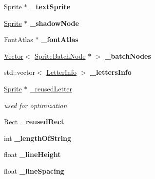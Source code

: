 \begin{DoxyCompactItemize}
\mbox{\label{classLabel_a6715bd9c3cac7e5ca418534b9029056e}} 
\hyperlink{classSprite}{Sprite} $\ast$ {\bfseries \+\_\+text\+Sprite}
\item 
\mbox{\label{classLabel_acd459f1643def3eae29b4838f9bdc1d3}} 
\hyperlink{classSprite}{Sprite} $\ast$ {\bfseries \+\_\+shadow\+Node}
\item 
\mbox{\label{classLabel_ad01212222e70bbb8566f6f8691d4c95e}} 
Font\+Atlas $\ast$ {\bfseries \+\_\+font\+Atlas}
\item 
\mbox{\label{classLabel_a86151a330d6714cc939d6b8fc16f3f85}} 
\hyperlink{classVector}{Vector}$<$ \hyperlink{classSpriteBatchNode}{Sprite\+Batch\+Node} $\ast$ $>$ {\bfseries \+\_\+batch\+Nodes}
\item 
\mbox{\label{classLabel_a4050f38882b85db87a44968c7234a4a8}} 
std\+::vector$<$ \hyperlink{structLabel_1_1LetterInfo}{Letter\+Info} $>$ {\bfseries \+\_\+letters\+Info}
\item 
\mbox{\label{classLabel_afe535db3ec9d3884ac90ff5fa8aa4f44}} 
\hyperlink{classSprite}{Sprite} $\ast$ \hyperlink{classLabel_afe535db3ec9d3884ac90ff5fa8aa4f44}{\+\_\+reused\+Letter}
\begin{DoxyCompactList}\small\item\em used for optimization \end{DoxyCompactList}\item 
\mbox{\label{classLabel_a261e5347d2a6d93b6b32dcce0e21b8c3}} 
\hyperlink{classRect}{Rect} {\bfseries \+\_\+reused\+Rect}
\item 
\mbox{\label{classLabel_a7bc1c1a79d7ace688b0588978c8dfb3b}} 
int {\bfseries \+\_\+length\+Of\+String}
\item 
\mbox{\label{classLabel_ad0e0095344d8e7705b564de319675115}} 
float {\bfseries \+\_\+line\+Height}
\item 
\mbox{\label{classLabel_a1ed1b38c28d235648a9c2d6b36c4ed4e}} 
float {\bfseries \+\_\+line\+Spacing}
\item 
\mbox{\label{classLabel_a2689b0cf9834f818b194b646e6f9e194}} 

\end{DoxyCompactItemize}
